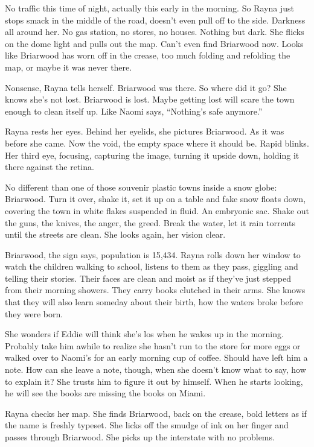 \documentclass[twoside,10pt]{book}
\begin{document}
No traffic this time of night, actually this early in the morning. So
Rayna just stops smack in the middle of the road, doesn't even pull off
to the side. Darkness all around her. No gas station, no stores, no
houses. Nothing but dark. She flicks on the dome light and pulls out the
map. Can't even find Briarwood now. Looks like Briarwood has worn off in
the crease, too much folding and refolding the map, or maybe it was
never there.

Nonsense, Rayna tells herself. Briarwood was there. So where did it go?
She knows she's not lost. Briarwood is lost. Maybe getting lost will
scare the town enough to clean itself up. Like Naomi says, ``Nothing's
safe anymore.''

Rayna rests her eyes. Behind her eyelids, she pictures Briarwood. As it
was before she came. Now the void, the empty space where it should be.
Rapid blinks. Her third eye, focusing, capturing the image, turning it
upside down, holding it there against the retina.

No different than one of those souvenir plastic towns inside a snow
globe: Briarwood. Turn it over, shake it, set it up on a table and fake
snow floats down, covering the town in white flakes suspended in fluid.
An embryonic sac. Shake out the guns, the knives, the anger, the greed.
Break the water, let it rain torrents until the streets are clean. She
looks again, her vision clear.

Briarwood, the sign says, population is 15,434. Rayna rolls down her
window to watch the chil­dren walking to school, listens to them as they
pass, giggling and telling their stories. Their faces are clean and
moist as if they've just stepped from their morning showers. They carry
books clutched in their arms. She knows that they will also learn
someday about their birth, how the waters broke before they were born.

She wonders if Eddie will think she's los when he wakes up in the
morning. Probably take him awhile to realize she hasn't run to the store
for more eggs or walked over to Naomi's for an early morning cup of
coffee. Should have left him a note. How can she leave a note, though,
when she doesn't know what to say, how to explain it? She trusts him to
figure it out by himself. When he starts looking, he will see the books
are missing the books on Miami.

Rayna checks her map. She finds Briarwood, back on the crease, bold
letters as if the name is freshly typeset. She licks off the smudge of
ink on her finger and passes through Briarwood. She picks up the
interstate with no problems.
\end{document}
